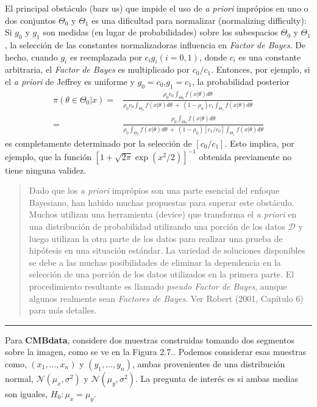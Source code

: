 \documentclass[12pt,]{article}
\begin{document}
El principal obstáculo (bars us) que impide el uso de \emph{a priori}
imprópios en uno o dos conjuntos \(\Theta_0\) y \(\Theta_1\) es una
dificultad para normalizar (normalizing difficulty): Si \(g_0\) y
\(g_1\) son medidas (en lugar de probabilidades) sobre los subespacios
\(\Theta_0\) y \(\Theta_1\), la selección de las constantes
normalizadoras influencia en \emph{Factor de Bayes}. De hecho, cuando
\(g_i\) es reemplazada por \(c_i g_i (i=0,1)\), donde \(c_i\) es una
constante arbitraria, el \emph{Factor de Bayes} es multiplicado por
\(c_0/c_1\). Entonces, por ejemplo, si el \emph{a priori} de Jeffrey es
uniforme y \(g_0=c_0\),\(g_1=c_1\), la probabilidad posterior \[
\begin{array}{rr}
\displaystyle \pi(\theta\in\Theta_0|x)=&\frac{\displaystyle \rho_0c_0\int_{\Theta_0}f(x|\theta)d\theta}{\displaystyle \rho_0c_0\int_{\Theta_0}f(x|\theta)d\theta\ +\ (1-\rho_0)c_1\int_{\Theta_1}f(x|\theta)d\theta}\\
=&\frac{\displaystyle \rho_0\int_{\Theta_0}f(x|\theta)d\theta}{\displaystyle \rho_0\int_{\Theta_0}f(x|\theta)d\theta\ +\ (1-\rho_0)[c_1/c_0]\int_{\Theta_1}f(x|\theta)d\theta}
\end{array}
\] es completamente determinado por la selección de \([c_0/c_1]\). Esto
implica, por ejemplo, que la función \([1+\sqrt{2\pi}\exp(x^2/2)]^{-1}\)
obtenida previamente no tiene ninguna validez.

\begin{quote}
Dado que los \emph{a priori} imprópios son una parte esencial del
enfoque Bayesiano, han habido muchas propuestas para superar este
obstáculo. Muchos utilizan una herramienta (device) que transforma el
\emph{a priori} en una distribución de probabilidad utilizando una
porción de los datos \(\mathcal{D}\) y luego utilizan la otra parte de
los datos para realizar una prueba de hipótesis en una situación
estándar. La variedad de soluciones disponibles se debe a las muchas
posibilidades de eliminar la dependencia en la selección de una porción
de los datos utilizados en la primera parte. El procedimiento resultante
es llamado \emph{pseudo Factor de Bayes}, aunque algunos realmente sean
\emph{Factores de Bayes}. Ver Robert (2001, Capítulo 6) para más
detalles.
\end{quote}

\begin{center}\rule{0.5\linewidth}{\linethickness}\end{center}

Para \textbf{CMBdata}, considere dos muestras construidas tomando dos
segmentos sobre la imagen, como se ve en la Figura 2.7.. Podemos
considerar esas muestras como, \((x_1,\ldots,x_n)\) y
\((y_1,\ldots,y_n)\), ambas provenientes de una distribución normal,
\(\mathcal{N}(\mu_x, \sigma^2)\) y \(\mathcal{N}(\mu_y, \sigma^2)\). La
pregunta de interés es si ambas medias son iguales, \(H_0:\mu_x=\mu_y\).
\end{document}
